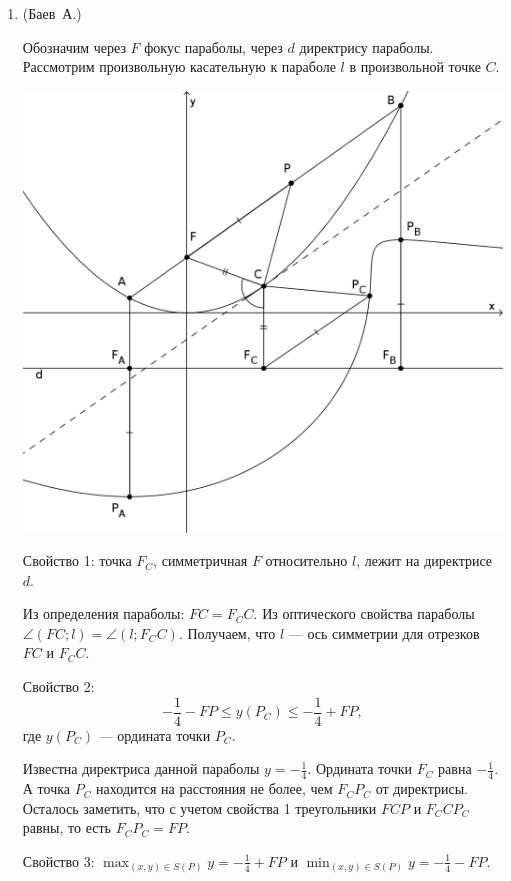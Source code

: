 \begin{enumerate}
\item (Баев~А.)

Обозначим через $F$ фокус параболы,  через $d$ директрису параболы. Рассмотрим произвольную касательную к параболе $l$ в произвольной точке $C$.

\begin{center}
\includegraphics[scale=0.9]{pictures/2017-republic}
\end{center}

Свойство 1: точка $F_C$, симметричная $F$ относительно $l$, лежит на директрисе $d$. 

Из определения параболы: $FC = F_CC$. Из оптического свойства параболы $\angle(FC; l) = \angle(l; F_CC)$. Получаем, что $l$ --- ось симметрии для отрезков $FC$ и $F_CC$. 

Свойство 2: $$ -\frac{1}{4} - FP \leqslant y(P_C)  \leqslant -\frac{1}{4} + FP,$$
где $y(P_C)$ --- ордината точки $P_C$.

Известна директриса данной параболы $y = -\frac{1}{4}$. Ордината точки $F_C$ равна $-\frac{1}{4}$. А точка $P_C$ находится на расстояния не более, чем $F_CP_C$ от директрисы. Осталось заметить, что с учетом свойства 1 треугольники $FCP$ и $F_CCP_C$ равны, то есть $F_CP_C = FP$.

Свойство 3:  $\displaystyle \max_{(x, y) \in S(P)} y = -\frac{1}{4} + FP$ и $\displaystyle \min_{(x, y) \in S(P)} y = -\frac{1}{4} - FP$. 


\end{enumerate}
